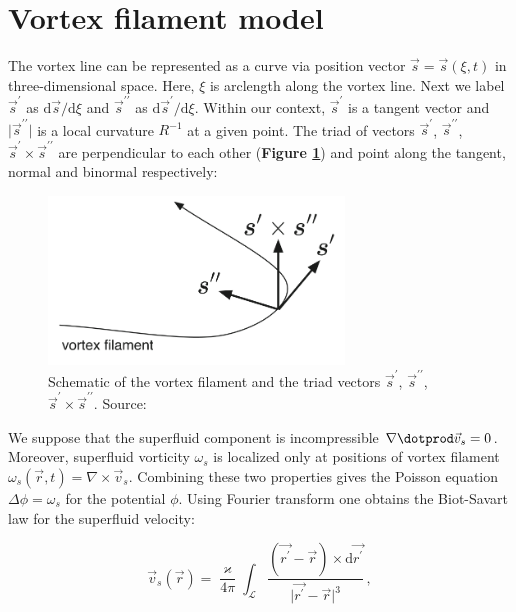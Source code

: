 
\section{Vortex filament model}

The vortex line can be represented as a curve via position vector $\vec{s} = \vec{s}(\xi, t)$ in three-dimensional space. Here, $\xi$ is arclength along the vortex line. Next we label $\vec{s}^{\prime}$ as $\text{d}\vec{s} / \text{d} \xi$ and $\vec{s}^{\prime\prime}$ as $\text{d}\vec{s}^{\prime} / \text{d} \xi$.
Within our context, $\vec{s}^{\prime}$ is a tangent vector and $\vert \vec{s}^{\prime\prime} \vert$ is a local curvature $R^{-1}$ at a given point.
The triad of vectors $\vec{s}^{\prime}$, $\vec{s}^{\prime\prime}$, $\vec{s}^{\prime} \times \vec{s}^{\prime\prime}$ are perpendicular to each other (\textbf{Figure \ref{filament}}) and point along the tangent, normal and binormal respectively:

\begin{figure}[h]
	\centering
	\includegraphics[width=0.7\textwidth]{graphics/theory/filament}
	\caption{Schematic of the vortex filament and the triad vectors $\vec{s}^{\prime}$, $\vec{s}^{\prime\prime}$, $\vec{s}^{\prime} \times \vec{s}^{\prime\prime}$. Source: \cite{tsubota}}
	\label{filament}
\end{figure}

We suppose that the superfluid component is incompressible $\nabla \dotprod \vec{v}_s = 0$. Moreover, superfluid vorticity $\omega_s$ is localized only at positions of vortex filament $\omega_s(\vec{r},t) = \nabla \times \vec{v}_s$. Combining these two properties gives the Poisson equation $\Delta \phi = \omega_s$ for the potential $\phi$.
Using Fourier transform one obtains \cite{barenghi} the Biot-Savart law for the superfluid velocity:

\begin{equation}
\vec{v}_s(\vec{r}) = \frac{\varkappa}{4\pi} \int_{\mathcal{L}} \frac{(\vec{r^{\prime}} - \vec{r}) \times \text{d}\vec{r^{\prime}}}{\vert \vec{r^{\prime}} - \vec{r} \vert^3}\,,
\label{biot_general}
\end{equation}

